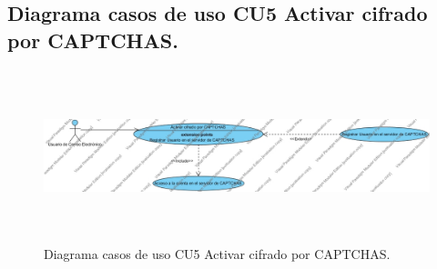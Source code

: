 \documentclass[12pt,oneside,onecolumn,openany]{report}
\begin{document}
\pagebreak

\subsection{Diagrama casos de uso CU5 Activar cifrado por CAPTCHAS.}
\begin{figure}[H]
	\includegraphics[width=1\linewidth, height=5cm]{./images/casodeuso5.jpg}
	\caption{Diagrama casos de uso CU5 Activar cifrado por CAPTCHAS.}
	\label{fig:4-6-1}
\end{figure}
\end{document}
